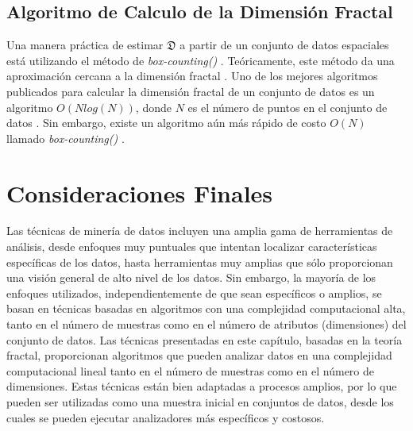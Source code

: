  
\subsection*{Algoritmo de Calculo de la Dimensión Fractal}
 
 Una manera práctica de estimar $\mathfrak{D}$  a partir de un conjunto de datos espaciales está utilizando el método de  \textit{box-counting()} \cite{Faloutsos:2000:SJS:335191.335412}. Teóricamente, este método da una aproximación cercana a la dimensión fractal   \cite{traina1999distance}. Uno de los mejores algoritmos publicados para calcular la dimensión fractal  de un conjunto de datos es un algoritmo $O (N log (N))$, donde $N$ es el número de puntos en el conjunto de datos \cite{Belussi:1995:ESS:645921.673166}.   Sin embargo, existe un algoritmo aún más  rápido  de costo  $O (N)$  llamado \textit{box-counting()} \cite{journals/jidm/TrainaTF10}.
 
\section{Consideraciones Finales}

Las técnicas de minería de datos incluyen una amplia gama de herramientas de análisis, desde enfoques muy puntuales que intentan localizar características específicas de los datos, hasta herramientas muy amplias que sólo proporcionan una visión general de alto nivel de los datos. Sin embargo, la mayoría de los enfoques utilizados, independientemente de que sean específicos o amplios, se basan en técnicas basadas en algoritmos con una complejidad computacional  alta, tanto en el número de muestras como en el número de atributos (dimensiones) del conjunto de datos. Las técnicas presentadas en este capítulo, basadas en la teoría fractal, proporcionan algoritmos que pueden analizar datos en una complejidad computacional lineal tanto en el número de muestras como en el número de dimensiones. Estas técnicas están bien adaptadas a procesos amplios, por lo que pueden ser utilizadas como una muestra inicial en conjuntos de datos, desde los cuales se pueden ejecutar analizadores más específicos y costosos.

 

